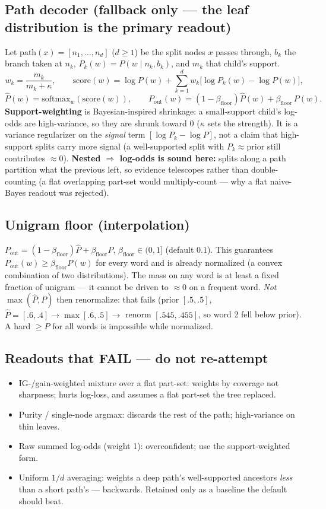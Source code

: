 \documentclass[11pt]{article}
\begin{document}
\subsection{Path decoder (fallback only --- the leaf distribution is the primary readout)}
Let $\mathrm{path}(x)=[n_1,\dots,n_d]$ ($d\ge1$) be the split nodes $x$ passes through, $b_k$ the branch taken at $n_k$, $P_k(w)=P(w\mid n_k,b_k)$, and $m_k$ that child's support.
\[
w_k=\frac{m_k}{m_k+\kappa},\qquad
\mathrm{score}(w)=\log P(w)+\sum_{k=1}^{d} w_k\big[\log P_k(w)-\log P(w)\big],
\]
\[
\widehat P(w)=\mathrm{softmax}_w(\mathrm{score}(w)),\qquad
P_{\text{out}}(w)=(1-\beta_{\text{floor}})\widehat P(w)+\beta_{\text{floor}}\,P(w).
\]
\textbf{Support-weighting} is Bayesian-inspired shrinkage: a small-support child's log-odds are high-variance, so they are shrunk toward $0$ ($\kappa$ sets the strength). It is a variance regularizer on the \emph{signal} term $[\log P_k-\log P]$, not a claim that high-support splits carry more signal (a well-supported split with $P_k\approx\text{prior}$ still contributes $\approx0$). \textbf{Nested $\Rightarrow$ log-odds is sound here:} splits along a path partition what the previous left, so evidence telescopes rather than double-counting (a flat overlapping part-set would multiply-count --- why a flat naive-Bayes readout was rejected).


\subsection{Unigram floor (interpolation)}
$P_{\text{out}}=(1-\beta_{\text{floor}})\widehat P+\beta_{\text{floor}}P$, $\beta_{\text{floor}}\in(0,1]$ (default $0.1$). This guarantees $P_{\text{out}}(w)\ge\beta_{\text{floor}}P(w)$ for every word and is already normalized (a convex combination of two distributions). The mass on any word is at least a fixed fraction of unigram --- it cannot be driven to $\approx0$ on a frequent word. \emph{Not} $\max(\widehat P,P)$ then renormalize: that fails (prior $[.5,.5]$, $\widehat P=[.6,.4]\to\max[.6,.5]\to$ renorm $[.545,.455]$, so word 2 fell below prior). A hard $\ge P$ for all words is impossible while normalized.


\subsection{Readouts that FAIL --- do not re-attempt}
\begin{itemize}[nosep]
\item IG-/gain-weighted mixture over a flat part-set: weights by coverage not sharpness; hurts log-loss, and assumes a flat part-set the tree replaced.
\item Purity / single-node argmax: discards the rest of the path; high-variance on thin leaves.
\item Raw summed log-odds (weight 1): overconfident; use the support-weighted form.
\item Uniform $1/d$ averaging: weights a deep path's well-supported ancestors \emph{less} than a short path's --- backwards. Retained only as a baseline the default should beat.
\end{itemize}
\end{document}
